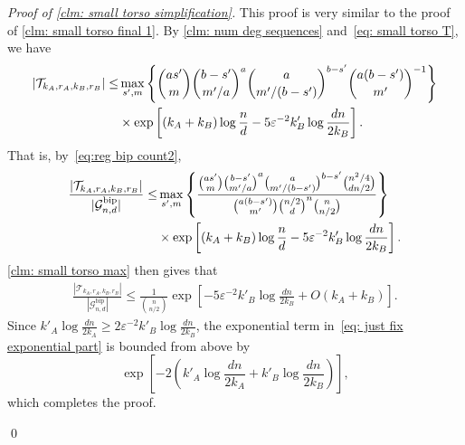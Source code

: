 \documentclass[11pt]{article}
\newcommand{\eps}{\varepsilon}
\theoremstyle{plain}
\begin{document}
\noindent\textit{Proof of \cref{clm: small torso simplification}.} This proof is very similar to the proof of \cref{clm: small torso final 1}. By \cref{clm: num deg sequences} and~\eqref{eq: small torso T}, we have 
\begin{align*}
    |\mathcal T_{k_A, r_A, k_B, r_B}| \leq& \max_{s', m}\left\{\binom{as'}{m}\binom{b - s'}{m'/a}^a\binom{a}{m'/(b - s')}^{b - s'}\binom{a(b - s')}{m'}^{-1} \right\}\notag \\
    &\times \exp\left[(k_A + k_B)\log\frac{n}{d}-5\eps^{-2}k_B'\log\frac{dn}{2k_B}\right].
\end{align*}
 That is, by~\eqref{eq:reg bip count2}, 
\begin{align}
    \frac{|\mathcal T_{k_A, r_A, k_B, r_B}|}{|\mathcal G_{n,d}^\text{bip}|} \leq& \max_{s', m}\left\{\frac{ \binom{as'}{m}\binom{b - s'}{m'/a}^a\binom{a}{m'/(b - s')}^{b-s'}\binom{n^2/4}{dn/2}}{\binom{a(b - s')}{m'}\binom{n/2}{d}^n\binom{n}{n/2} }\right\}\notag\\
    &\times \exp\left[(k_A + k_B)\log\frac{n}{d} -5\eps^{-2}k'_B\log\frac{dn}{2k_B}\right].\notag
\end{align}
\cref{clm: small torso max} then gives that 
\begin{align}
    \frac{|\mathcal T_{k_A, r_A, k_B, r_B}|}{|\mathcal G_{n,d}^\text{bip}|} \leq \frac{1}{\binom{n}{n/2}}\exp\left[-5\eps^{-2}k'_B\log\frac{dn}{2k_B} + O(k_A + k_B)\right].\label{eq: just fix exponential part}
\end{align}
Since $k'_A\log\frac{dn}{2k_A} \geq 2\eps^{-2}k'_B\log\frac{dn}{2k_B}$, the exponential term in~\eqref{eq: just fix exponential part} is bounded from above by 
\[
\exp\left[-2\left(k'_A \log\frac{dn}{2k_A } + k'_B\log\frac{dn}{2k_B}\right)\right],
\]
which completes the proof.

\qed
\end{document}
